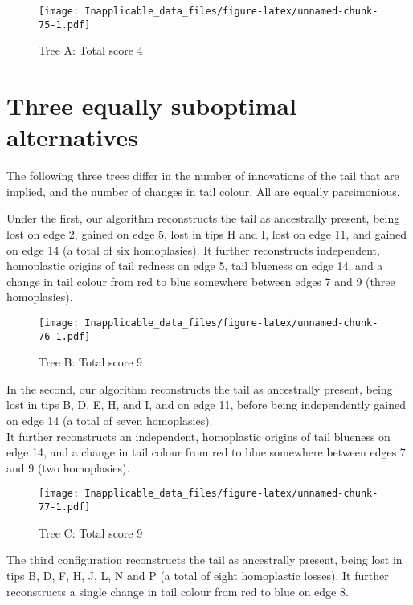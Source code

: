 \documentclass[]{book}
\theoremstyle{definition}
\theoremstyle{definition}
\theoremstyle{definition}
\theoremstyle{remark}
\begin{document}
\begin{figure}
\centering
\texttt{[image: Inapplicable\_data\_files/figure-latex/unnamed-chunk-75-1.pdf]}
\caption{\label{fig:unnamed-chunk-75}Tree A: Total score 4}
\end{figure}

\hypertarget{three-equally-suboptimal-alternatives}{%
\section{Three equally suboptimal
alternatives}\label{three-equally-suboptimal-alternatives}}

The following three trees differ in the number of innovations of the
tail that are implied, and the number of changes in tail colour. All are
equally parsimonious.

Under the first, our algorithm reconstructs the tail as ancestrally
present, being lost on edge 2, gained on edge 5, lost in tips H and I,
lost on edge 11, and gained on edge 14 (a total of six homoplasies). It
further reconstructs independent, homoplastic origins of tail redness on
edge 5, tail blueness on edge 14, and a change in tail colour from red
to blue somewhere between edges 7 and 9 (three homoplasies).

\begin{figure}
\centering
\texttt{[image: Inapplicable\_data\_files/figure-latex/unnamed-chunk-76-1.pdf]}
\caption{\label{fig:unnamed-chunk-76}Tree B: Total score 9}
\end{figure}

In the second, our algorithm reconstructs the tail as ancestrally
present, being lost in tips B, D, E, H, and I, and on edge 11, before
being independently gained on edge 14 (a total of seven homoplasies).\\
It further reconstructs an independent, homoplastic origins of tail
blueness on edge 14, and a change in tail colour from red to blue
somewhere between edges 7 and 9 (two homoplasies).

\begin{figure}
\centering
\texttt{[image: Inapplicable\_data\_files/figure-latex/unnamed-chunk-77-1.pdf]}
\caption{\label{fig:unnamed-chunk-77}Tree C: Total score 9}
\end{figure}

The third configuration reconstructs the tail as ancestrally present,
being lost in tips B, D, F, H, J, L, N and P (a total of eight
homoplastic losses). It further reconstructs a single change in tail
colour from red to blue on edge 8.
\end{document}
